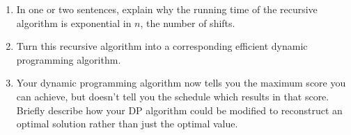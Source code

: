 \documentclass[12 pt, letterpaper]{hmcpset}
\begin{document}
\begin{problem}
\begin{enumerate}[label = \arabic*.]
		\item In one or two sentences, explain why the running time of the recursive algorithm is exponential in $n$, the number of shifts.

		\item Turn this recursive algorithm into a corresponding efficient dynamic programming algorithm.

		\item Your dynamic programming algorithm now tells you the maximum score you can achieve, but doesn't tell you the schedule which results in that score. Briefly describe how your DP algorithm could be modified to reconstruct an optimal solution rather than just the optimal value.
	\end{enumerate}
\end{problem}
\end{document}
